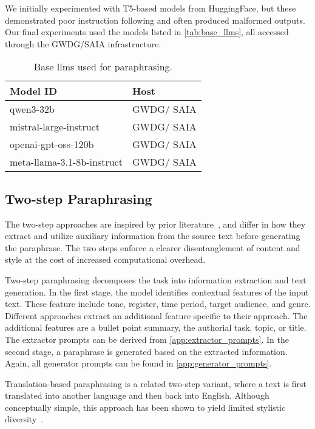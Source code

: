 We initially experimented with T5-based models from HuggingFace, but these demonstrated poor instruction following and often produced malformed outputs. 
Our final experiments used the models listed in \autoref{tab:base_llms}, all accessed through the GWDG/SAIA infrastructure.

\begin{table}[]
\centering
\caption{Base \acp{llm} used for paraphrasing.}
\label{tab:base_llms}
\begin{tabular}{ll}
\toprule
\textbf{Model ID}                    & \textbf{Host} \\
\midrule
qwen3-32b                            & GWDG/ SAIA    \\
mistral-large-instruct               & GWDG/ SAIA    \\
openai-gpt-oss-120b                  & GWDG/ SAIA    \\
meta-llama-3.1-8b-instruct           & GWDG/ SAIA    \\
\bottomrule   
\end{tabular}%
\end{table}


\subsection{Two-step Paraphrasing}

The two-step approaches are inspired by prior literature~\citep{bevendorff_overview_2024, ayele_overview_2024}, and differ in how they extract and utilize auxiliary information from the source text before generating the paraphrase. 
The two steps enforce a clearer disentanglement of content and style at the cost of increased computational overhead.

Two-step paraphrasing decomposes the task into information extraction and text generation. 
In the first stage, the model identifies contextual features of the input text.
These feature include tone, register, time period, target audience, and genre.
Different approaches extract an additional feature specific to their approach.
The additional features are a bullet point summary, the authorial task, topic, or title. 
The extractor prompts can be derived from \autoref{app:extractor_prompts}.
In the second stage, a paraphrase is generated based on the extracted information. 
Again, all generator prompts can be found in \autoref{app:generator_prompts}.

Translation-based paraphrasing is a related two-step variant, where a text is first translated into another language and then back into English. 
Although conceptually simple, this approach has been shown to yield limited stylistic diversity~\citep{zhou_paraphrase_2025}.